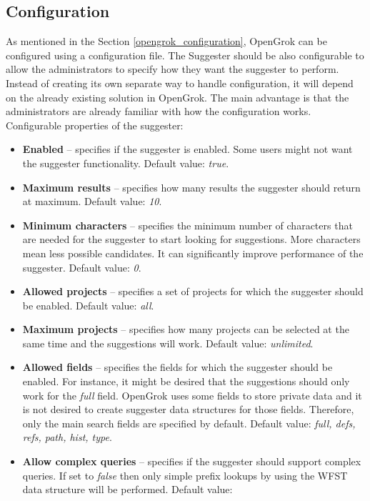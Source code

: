 \subsection{Configuration}
\label{suggester_config}
As mentioned in the Section \ref{opengrok_configuration}, OpenGrok can be configured using a configuration file.
The Suggester should be also configurable to allow the administrators to specify how they want the suggester to perform.
Instead of creating its own separate way to handle configuration, it will depend on the already existing solution in
OpenGrok. The main advantage is that the administrators are already familiar with how the configuration works. Configurable
properties of the suggester:
\begin{itemize}
    \item \textbf{Enabled} – specifies if the suggester is enabled. Some users might not want the suggester functionality.
    Default value: \textit{true}.
    \item \textbf{Maximum results} – specifies how many results the suggester should return at maximum. Default value: \textit{10}.
    \item \textbf{Minimum characters} – specifies the minimum number of characters that are needed for the suggester to start looking
    for suggestions. More characters mean less possible candidates. It can significantly improve performance of the
    suggester. Default value: \textit{0}.
    \item \textbf{Allowed projects} – specifies a set of projects for which the suggester should be enabled. Default value: \textit{all}.
    \item \textbf{Maximum projects} – specifies how many projects can be selected at the same time and the suggestions will work.
    Default value: \textit{unlimited}.
    \item \textbf{Allowed fields} – specifies the fields for which the suggester should be enabled. For instance, it might be
    desired that the suggestions should only work for the \textit{full} field. OpenGrok uses some fields to store
    private data and it is not desired to create suggester data structures for those fields. Therefore, only the main
    search fields are specified by default.
    Default value: \textit{full, defs, refs, path, hist, type}.
    \item \textbf{Allow complex queries} – specifies if the suggester should support complex queries. If set to
    \textit{false} then only simple prefix lookups by using the WFST data structure will be performed. Default value:

\end{itemize}
